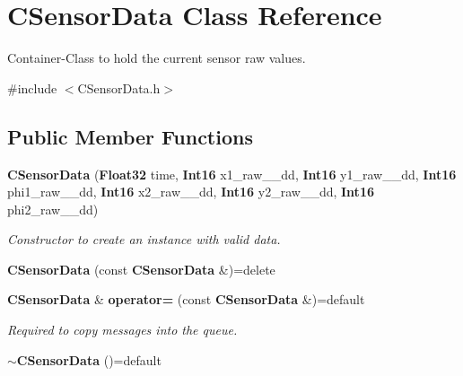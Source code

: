 \section{C\-Sensor\-Data Class Reference}
\label{classCSensorData}


Container-\/\-Class to hold the current sensor raw values.  




{\ttfamily \#include $<$C\-Sensor\-Data.\-h$>$}

\subsection*{Public Member Functions}
\begin{DoxyCompactItemize}
\item 
{\bf C\-Sensor\-Data} ({\bf Float32} time, {\bf Int16} x1\-\_\-raw\-\_\-\-\_\-dd, {\bf Int16} y1\-\_\-raw\-\_\-\-\_\-dd, {\bf Int16} phi1\-\_\-raw\-\_\-\-\_\-dd, {\bf Int16} x2\-\_\-raw\-\_\-\-\_\-dd, {\bf Int16} y2\-\_\-raw\-\_\-\-\_\-dd, {\bf Int16} phi2\-\_\-raw\-\_\-\-\_\-dd)
\begin{DoxyCompactList}\small\item\em Constructor to create an instance with valid data. \end{DoxyCompactList}\item 
{\bf C\-Sensor\-Data} (const {\bf C\-Sensor\-Data} \&)=delete
\item 
{\bf C\-Sensor\-Data} \& {\bf operator=} (const {\bf C\-Sensor\-Data} \&)=default
\begin{DoxyCompactList}\small\item\em Required to copy messages into the queue. \end{DoxyCompactList}\item 
{\bf $\sim$\-C\-Sensor\-Data} ()=default
\end{DoxyCompactItemize}
